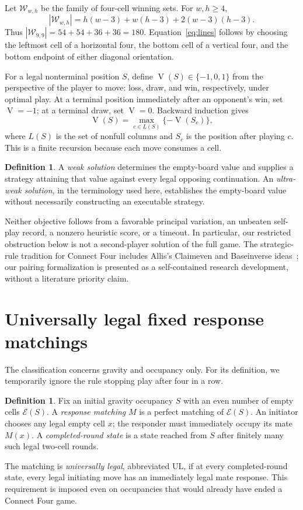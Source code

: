 \documentclass[11pt]{article}
\theoremstyle{definition}
\newtheorem{definition}[theorem]{Definition}
\theoremstyle{remark}
\newcommand{\W}{\mathcal W}
\newcommand{\E}{\mathcal E}
\newcommand{\UL}{\mathrm{UL}}
\newcommand{\Val}{\operatorname{V}}
\begin{document}
Let $\W_{w,h}$ be the family of four-cell winning sets. For $w,h\ge4$,
\begin{equation}\label{eq:lines}
 |\W_{w,h}|=h(w-3)+w(h-3)+2(w-3)(h-3).
\end{equation}
Thus $|\W_{9,9}|=54+54+36+36=180$. Equation~\eqref{eq:lines} follows by
choosing the leftmost cell of a horizontal four, the bottom cell of a
vertical four, and the bottom endpoint of either diagonal orientation.

For a legal nonterminal position $S$, define $\Val(S)\in\{-1,0,1\}$ from the
perspective of the player to move: loss, draw, and win, respectively, under
optimal play. At a terminal position immediately after an opponent's win,
set $\Val=-1$; at a terminal draw, set $\Val=0$. Backward induction gives
\begin{equation}\label{eq:minimax}
 \Val(S)=\max_{c\in L(S)}\{-\Val(S_c)\},
\end{equation}
where $L(S)$ is the set of nonfull columns and $S_c$ is the position after
playing $c$. This is a finite recursion because each move consumes a cell.

\begin{definition}
A \emph{weak solution} determines the empty-board value and supplies a
strategy attaining that value against every legal opposing continuation.
An \emph{ultra-weak solution}, in the terminology used here, establishes the
empty-board value without necessarily constructing an executable strategy.
\end{definition}

Neither objective follows from a favorable principal variation, an unbeaten
self-play record, a nonzero heuristic score, or a timeout. In particular,
our restricted obstruction below is not a second-player solution of the
full game. The strategic-rule tradition for Connect Four includes Allis's
Claimeven and Baseinverse ideas~\cite{allis}; our pairing formalization is
presented as a self-contained research development, without a literature
priority claim.

\section[Universally legal response matchings]{Universally legal fixed response matchings}\label{sec:classification}
The classification concerns gravity and occupancy only. For its definition,
we temporarily ignore the rule stopping play after four in a row.

\begin{definition}\label{def:ul}
Fix an initial gravity occupancy $S$ with an even number of empty cells
$\E(S)$. A \emph{response matching} $M$ is a perfect matching of $\E(S)$.
An initiator chooses any legal empty cell $x$; the responder must immediately
occupy its mate $M(x)$. A \emph{completed-round state} is a state reached
from $S$ after finitely many such legal two-cell rounds.

The matching is \emph{universally legal}, abbreviated $\UL$, if at every
completed-round state, every legal initiating move has an immediately legal
mate response. This requirement is imposed even on occupancies that would
already have ended a Connect Four game.
\end{definition}
\end{document}
